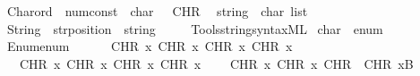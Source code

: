 \begin{isabellebody}
\ \ {\isachardoublequoteopen}{\isacharunderscore}{\kern0pt}Char{\isacharunderscore}{\kern0pt}ord{\isachardoublequoteclose}\ {\isacharcolon}{\kern0pt}{\isacharcolon}{\kern0pt}\ {\isachardoublequoteopen}num{\isacharunderscore}{\kern0pt}const\ {\isasymRightarrow}\ char{\isachardoublequoteclose}\ \ \ {\isacharparenleft}{\kern0pt}{\isachardoublequoteopen}CHR\ {\isacharunderscore}{\kern0pt}{\isachardoublequoteclose}{\isacharparenright}{\kern0pt}\isanewline
\isanewline
{}\isamarkupfalse%
\ string\ {\isacharequal}{\kern0pt}\ {\isachardoublequoteopen}char\ list{\isachardoublequoteclose}\isanewline
\isanewline
{}\isamarkupfalse%
\isanewline
\ \ {\isachardoublequoteopen}{\isacharunderscore}{\kern0pt}String{\isachardoublequoteclose}\ {\isacharcolon}{\kern0pt}{\isacharcolon}{\kern0pt}\ {\isachardoublequoteopen}str{\isacharunderscore}{\kern0pt}position\ {\isasymRightarrow}\ string{\isachardoublequoteclose}\ \ \ \ {\isacharparenleft}{\kern0pt}{\isachardoublequoteopen}{\isacharunderscore}{\kern0pt}{\isachardoublequoteclose}{\isacharparenright}{\kern0pt}\isanewline
%
\isadelimML
\isanewline
%
\endisadelimML
%
\isatagML
{}\isamarkupfalse%
\ {\isacartoucheopen}Tools{\isacharslash}{\kern0pt}string{\isacharunderscore}{\kern0pt}syntax{\isachardot}{\kern0pt}ML{\isacartoucheclose}%
\endisatagML
{\isafoldML}%
%
\isadelimML
\isanewline
%
\endisadelimML
\isanewline
{}\isamarkupfalse%
\ char\ {\isacharcolon}{\kern0pt}{\isacharcolon}{\kern0pt}\ enum\isanewline
{}\isanewline
\isanewline
{}\isamarkupfalse%
\isanewline
\ \ {\isachardoublequoteopen}Enum{\isachardot}{\kern0pt}enum\ {\isacharequal}{\kern0pt}\ {\isacharbrackleft}{\kern0pt}\isanewline
\ \ \ \ CHR\ {}x{}{}{\isacharcomma}{\kern0pt}\ CHR\ {}x{}{}{\isacharcomma}{\kern0pt}\ CHR\ {}x{}{}{\isacharcomma}{\kern0pt}\ CHR\ {}x{}{}{\isacharcomma}{\kern0pt}\isanewline
\ \ \ \ CHR\ {}x{}{}{\isacharcomma}{\kern0pt}\ CHR\ {}x{}{}{\isacharcomma}{\kern0pt}\ CHR\ {}x{}{}{\isacharcomma}{\kern0pt}\ CHR\ {}x{}{}{\isacharcomma}{\kern0pt}\isanewline
\ \ \ \ CHR\ {}x{}{}{\isacharcomma}{\kern0pt}\ CHR\ {}x{}{}{\isacharcomma}{\kern0pt}\ CHR\ {\isacharprime}{\kern0pt}{\isacharprime}{\kern0pt}{\isasymnewline}{\isacharprime}{\kern0pt}{\isacharprime}{\kern0pt}{\isacharcomma}{\kern0pt}\ CHR\ {}x{}B{\isacharcomma}{\kern0pt}\isanewline

\end{isabellebody}
